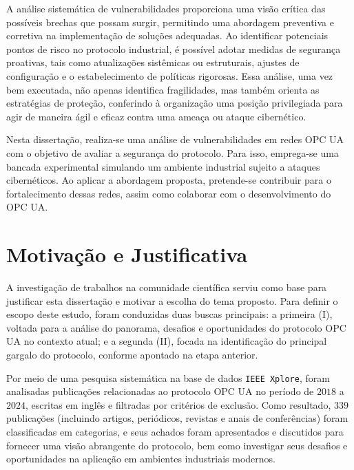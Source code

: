     A análise sistemática de vulnerabilidades proporciona uma visão crítica das possíveis brechas que possam surgir, permitindo uma abordagem preventiva e corretiva na implementação de soluções adequadas. Ao identificar potenciais pontos de risco no protocolo industrial, é possível adotar medidas de segurança proativas, tais como atualizações sistêmicas ou estruturais, ajustes de configuração e o estabelecimento de políticas rigorosas. Essa análise, uma vez bem executada, não apenas identifica fragilidades, mas também orienta as estratégias de proteção, conferindo à organização uma posição privilegiada para agir de maneira ágil e eficaz contra uma ameaça ou ataque cibernético.

    Nesta dissertação, realiza-se uma análise de vulnerabilidades em redes OPC UA com o objetivo de avaliar a segurança do protocolo. Para isso, emprega-se uma bancada experimental simulando um ambiente industrial sujeito a ataques cibernéticos. Ao aplicar a abordagem proposta, pretende-se contribuir para o fortalecimento dessas redes, assim como colaborar com o desenvolvimento do OPC UA.

    
    \section{Motivação e Justificativa} \label{sec:motivacao}

    A investigação de trabalhos na comunidade científica serviu como base para justificar esta dissertação e motivar a escolha do tema proposto. Para definir o escopo deste estudo, foram conduzidas duas buscas principais: a primeira (I), voltada para a análise do panorama, desafios e oportunidades do protocolo OPC UA no contexto atual; e a segunda (II), focada na identificação do principal gargalo do protocolo, conforme apontado na etapa anterior.
    
    Por meio de uma pesquisa sistemática na base de dados \texttt{IEEE Xplore}, foram analisadas publicações relacionadas ao protocolo OPC UA no período de $2018$ a $2024$, escritas em inglês e filtradas por critérios de exclusão. Como resultado, $339$ publicações (incluindo artigos, periódicos, revistas e anais de conferências) foram classificadas em categorias, e seus achados foram apresentados e discutidos para fornecer uma visão abrangente do protocolo, bem como investigar seus desafios e oportunidades na aplicação em ambientes industriais modernos.

